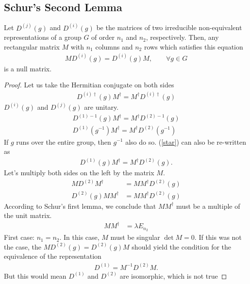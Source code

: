 \subsection{Schur's Second Lemma} %
\label{sub:Schur's Second Lemma}
\begin{theorem}
    Let $D^{(j)}(g)$ and $D^{(i)}(g)$ be the matrices of two irreducible non-equivalent
    representations of a group $G$ of order $n_1$ and $n_2$, respectively. Then, any
    rectangular matrix $M$ with $n_1$ columns and $n_2$ rows which satisfies this
    equation
    \begin{align}
        MD^{(i)}(g)=D^{(i)}(g)M,\qquad\forall g\in G
    \end{align}
    is a null matrix.
\end{theorem}

\begin{proof}
Let us take the Hermitian conjugate on both sides
\begin{align}
    D^{(i)\dagger}(g)M^\dagger=M^\dagger D^{(i)\dagger}(g)
\end{align}
$D^{(i)}(g)$ and $D^{(j)}(g)$ are unitary.
\begin{align}
    D^{(1)-1}(g)M^\dagger=M^\dagger D^{(2)-1}(g)\\
    D^{(1)}(g^{-1})M^\dagger=M^\dagger D^{(2)}(g^{-1})
\end{align}
If $g$ runs over the entire group, then $g^{-1}$ also do so. (\autoref{star})
can also be re-written as
\begin{align}
    D^{(1)}(g)M^\dagger=M^\dagger D^{(2)}(g).
\end{align}
Let's multiply both sides on the left by the matrix $M$.
\begin{align}
    MD^{(2)}M^\dagger&=MM^\dagger D^{(2)}(g)\\
    D^{(2)}(g)MM^\dagger&=MM^\dagger D^{(2)}(g)
\end{align}
According to Schur's first lemma, we conclude that $MM^\dagger$ must be a
multiple of the unit matrix.
\begin{align}
    MM^\dagger&=\lambda E_{n_2}
\end{align}
First case: $n_1=n_2$. In this case, $M$ must be singular $\det M=0$.
If this was not the case, the $MD^{(2)}(g)=D^{(2)}(g)M$ should yield the
condition for the equivalence of the representation
\begin{align}
    D^{(1)}=M^{-1}D^{(2)}M.
\end{align}
But this would mean $D^{(1)}$ and $D^{(2)}$ are isomorphic, which is not true

\end{proof}
